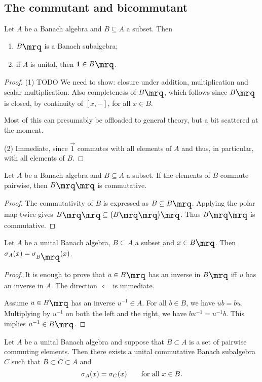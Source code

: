 \subsection{The commutant and bicommutant}
\begin{lemma} \label{commutantBanachSubalgebra}
Let $A$ be a Banach algebra and $B\subseteq A$ a subset. Then
\begin{enumerate}
\item $\comm{B}$ is a Banach subalgebra;
\item if $A$ is unital, then $\vec{1}\in \comm{B}$.
\end{enumerate}
\end{lemma}
\begin{proof}
(1) TODO We need to show: closure under addition, multiplication and scalar multiplication. Also completeness of $\comm{B}$, which follows since $\comm{B}$ is closed, by continuity of $[x,-]$, for all $x\in B$.

Most of this can presumably be offloaded to general theory, but a bit scattered at the moment.

(2) Immediate, since $\vec{1}$ commutes with all elements of $A$ and thus, in particular, with all elements of $B$.
\end{proof}

\begin{lemma}
Let $A$ be a Banach algebra and $B\subseteq A$ a subset. If the elements of $B$ commute pairwise, then $\bicomm{B}$ is commutative.
\end{lemma}
\begin{proof}
The commutativity of $B$ is expressed as $B\subseteq \comm{B}$. Applying the polar map twice gives $\bicomm{B}\subseteq \comm{\big(\bicomm{B}\big)}$. Thus $\bicomm{B}$ is commutative.
\end{proof}

\begin{proposition}
Let $A$ be a unital Banach algebra, $B\subseteq A$ a subset and $x\in \comm{B}$. Then $\spec_A(x) = \spec_{\comm{B}}(x)$.
\end{proposition}
\begin{proof}
It is enough to prove that $u\in \comm{B}$ has an inverse in $\comm{B}$ iff $u$ has an inverse in $A$. The direction $\Leftarrow$ is immediate.

Assume $u\in \comm{B}$ has an inverse $u^{-1}\in A$. For all $b\in B$, we have $ub = bu$. Multiplying by $u^{-1}$ on both the left and the right, we have $bu^{-1} = u^{-1}b$. This implies $u^{-1}\in \comm{B}$.
\end{proof}
\begin{corollary} \label{spectrumInCommutativeAlgebra}
Let $A$ be a unital Banach algebra and suppose that $B\subset A$ is a set of pairwise commuting elements. Then there exists a unital commutative Banach subalgebra $C$ such that $B\subset C\subset A$ and
\[ \sigma_A(x) = \sigma_C(x) \qquad \text{for all $x\in B$.} \]
\end{corollary}

